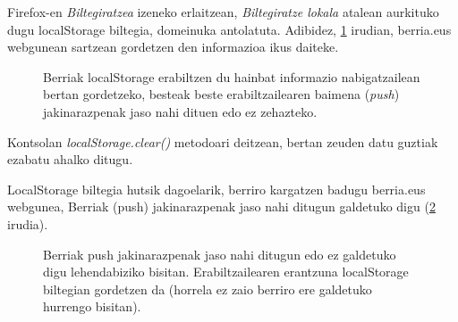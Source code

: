Firefox-en \textit{Biltegiratzea} izeneko erlaitzean, \textit{Biltegiratze lokala} atalean aurkituko dugu localStorage biltegia, domeinuka antolatuta. Adibidez, \ref{fig:localstorage3} irudian, berria.eus webgunean sartzean gordetzen den informazioa ikus daiteke.

\begin{figure}[ht]
	\centering
{}
\caption{Berriak localStorage erabiltzen du hainbat informazio nabigatzailean bertan gordetzeko, besteak beste erabiltzailearen baimena (\textit{push}) jakinarazpenak jaso nahi dituen edo ez zehazteko.}
\label{fig:localstorage3}
\end{figure}

Kontsolan \textit{localStorage.clear()}  metodoari deitzean, bertan zeuden datu guztiak ezabatu ahalko ditugu.


LocalStorage biltegia hutsik dagoelarik, berriro kargatzen badugu berria.eus webgunea, Berriak (push) jakinarazpenak jaso nahi ditugun galdetuko digu (\ref{fig:localstorage5} irudia). 


\begin{figure}[ht]
	\centering
{}
\caption{Berriak push jakinarazpenak jaso nahi ditugun edo ez galdetuko digu lehendabiziko bisitan. Erabiltzailearen erantzuna localStorage biltegian gordetzen da (horrela ez zaio berriro ere galdetuko hurrengo bisitan).}
\label{fig:localstorage5}
\end{figure}

